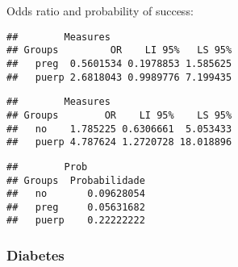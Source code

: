 \documentclass[
]{article}
\newenvironment{Shaded}{\begin{snugshade}}{\end{snugshade}}
\newcommand{\CommentTok}[1]{\textcolor[rgb]{0.56,0.35,0.01}{\textit{#1}}}
\newcommand{\KeywordTok}[1]{\textcolor[rgb]{0.13,0.29,0.53}{\textbf{#1}}}
\newcommand{\NormalTok}[1]{#1}
\newcommand{\OperatorTok}[1]{\textcolor[rgb]{0.81,0.36,0.00}{\textbf{#1}}}
\newcommand{\StringTok}[1]{\textcolor[rgb]{0.31,0.60,0.02}{#1}}
\begin{document}
Odds ratio and probability of success:

\begin{Shaded}
\end{Shaded}

\begin{verbatim}
##        Measures
## Groups         OR    LI 95%   LS 95%
##   preg  0.5601534 0.1978853 1.585625
##   puerp 2.6818043 0.9989776 7.199435
\end{verbatim}

\begin{Shaded}
\end{Shaded}

\begin{verbatim}
##        Measures
## Groups        OR    LI 95%    LS 95%
##   no    1.785225 0.6306661  5.053433
##   puerp 4.787624 1.2720728 18.018896
\end{verbatim}

\begin{Shaded}
\end{Shaded}

\begin{verbatim}
##        Prob
## Groups  Probabilidade
##   no       0.09628054
##   preg     0.05631682
##   puerp    0.22222222
\end{verbatim}

\hypertarget{diabetes-1}{%
\subsubsection{Diabetes}\label{diabetes-1}}

\begin{Shaded}
\end{Shaded}
\end{document}
